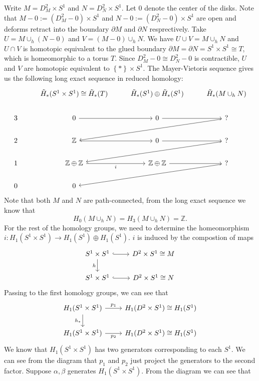 \documentclass[a4paper, 12pt]{article}
\begin{document}
\begin{solution}
Write \(M=D^2_M\times S^1\) and \(N=D^2_N\times S^1\). Let \(0\) denote the center of the disks. Note that \(M-0:=(D^2_M-0)\times S^1\) and \(N-0:=(D^2_N-0)\times S^1\) are open and deforms retract into the boundary \(\partial M\) and \(\partial N\) resprectively. Take 
\(U=M\cup_h(N-0)\) and \(V=(M-0)\cup_h N\). We have \(U\cup V=M\cup_h N\) and \(U\cap V\) is homotopic equivalent to the glued boundary \(\partial M=\partial N=S^1\times S^1\cong T\), which is homeomorphic to a torus \(T\). Since \(D^2_M-0\cong D^2_N-0\) is contractible, \(U\) and \(V\) are homotopic equivalent to \(\left\{ * \right\}\times S^1\). 
The Mayer-Vietoris sequence gives us the following long exact sequence in reduced homology:
\[\begin{tikzcd}
	& {\tilde{H}_*(S^1\times S^1)\cong \tilde{H}_*(T)} & {\tilde{H}_*(S^1)\oplus \tilde{H}_*(S^1)} & {\tilde{H}_*(M\cup_h N)} \\
	3 & 0 & 0 & {?} \\
	2 & {\mathbb{Z}} & 0 & {?} \\
	1 & {\mathbb{Z}\oplus \mathbb{Z}} & {\mathbb{Z}\oplus\mathbb{Z}} & {?} \\
	0 & 0
	\arrow[from=2-2, to=2-3]
	\arrow[from=2-3, to=2-4]
	\arrow[from=2-4, to=3-2]
	\arrow[from=3-2, to=3-3]
	\arrow[from=3-3, to=3-4]
	\arrow[from=3-4, to=4-2]
	\arrow["i"', from=4-2, to=4-3]
	\arrow[from=4-3, to=4-4]
	\arrow[from=4-4, to=5-2]
\end{tikzcd}\]
Note that both \(M\) and \(N\) are path-connected, from the long exact sequence we know that 
\[H_0(M\cup_h N)=H_3(M\cup_h N)=\mathbb{Z}.\]
For the rest of the homology groups, we need to determine the homeomorphism \(i:H_1(S^1\times S^1)\rightarrow H_1(S^1)\oplus H_1(S^1)\). \(i\) is induced by the compostion of maps 
\[\begin{tikzcd}
	{S^1\times S^1} & {D^2\times S^1\cong M} \\
	{S^1\times S^1} & {D^2\times S^1\cong N}
	\arrow[hook, from=1-1, to=1-2]
	\arrow["h"', from=1-1, to=2-1]
	\arrow[hook, from=2-1, to=2-2]
\end{tikzcd}\]
Passing to the first homology groups, we can see that 
\[\begin{tikzcd}
	{H_1(S^1\times S^1)} & {H_1(D^2\times S^1)\cong H_1(S^1)} \\
	{H_1(S^1\times S^1)} & {H_1(D^2\times S^1)\cong H_1(S^1)}
	\arrow["{p_1}", from=1-1, to=1-2]
	\arrow["{h_*}"', from=1-1, to=2-1]
	\arrow["{p_2}"', from=2-1, to=2-2]
\end{tikzcd}\]
We know that \(H_1(S^1\times S^1)\) has two generators corresponding to each \(S^1\). We can see from the diagram that \(p_1\) and \(p_2\) just project the generators to the second factor. Suppose \(\alpha,\beta\) generates \(H_1(S^1\times S^1)\). From the diagram we can see that 

\end{solution}
\end{document}
